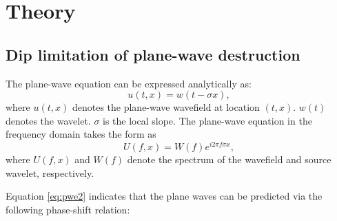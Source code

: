 %
%



\section{Theory}
\subsection{Dip limitation of plane-wave destruction}
The plane-wave equation can be expressed analytically as:
\begin{equation}
\label{eq:pwe}
u(t,x)=w(t-\sigma x),
\end{equation}
where $u(t,x)$ denotes the plane-wave wavefield at location $(t,x)$. $w(t)$ denotes the wavelet. $\sigma$ is the local slope. The plane-wave equation in the frequency domain takes the form as
\begin{equation}
\label{eq:pwe2}
U(f,x)=W(f)e^{i2\pi f\sigma x},
\end{equation}
where $U(f,x)$ and $W(f)$ denote the spectrum of the wavefield and source wavelet, respectively. 

Equation \ref{eq:pwe2} indicates that the plane waves can be predicted via the following phase-shift relation:

